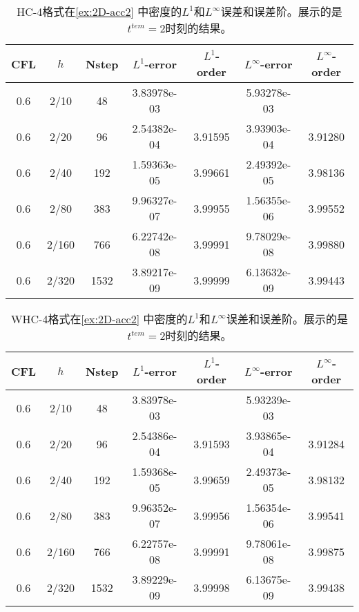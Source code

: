 \def\titleintable{CFL&$h$&Nstep&$L^1$-error&$L^1$-order&$L^\infty$-error&$L^\infty$-order\\}
\begin{table}[htbp]
  \caption{HC-4格式在\cref{ex:2D-acc2} 中密度的$L^1$和$L^\infty$误差和误差阶。展示的是$t^{tem} = 2$时刻的结果。}
  \label{ta:2D-ex2-HC4}
  \centering
  \begin{tabular}{ccccccc}
    \toprule
    \titleintable
    \midrule
    0.6 & 2/10  & 48   & 3.83978e-03 &         & 5.93278e-03 &         \\
    0.6 & 2/20  & 96   & 2.54382e-04 & 3.91595 & 3.93903e-04 & 3.91280 \\
    0.6 & 2/40  & 192  & 1.59363e-05 & 3.99661 & 2.49392e-05 & 3.98136 \\
    0.6 & 2/80  & 383  & 9.96327e-07 & 3.99955 & 1.56355e-06 & 3.99552 \\
    0.6 & 2/160 & 766  & 6.22742e-08 & 3.99991 & 9.78029e-08 & 3.99880 \\
    0.6 & 2/320 & 1532 & 3.89217e-09 & 3.99999 & 6.13632e-09 & 3.99443 \\
    \bottomrule
  \end{tabular}
\end{table}

\begin{table}[htbp]
  \caption{WHC-4格式在\cref{ex:2D-acc2} 中密度的$L^1$和$L^\infty$误差和误差阶。展示的是$t^{tem} = 2$时刻的结果。}
  \label{ta:2D-ex2-WHC4}
  \centering
  \begin{tabular}{ccccccc}
    \toprule
    \titleintable
    \midrule
    0.6 & 2/10  & 48   & 3.83978e-03 &         & 5.93239e-03 &         \\
    0.6 & 2/20  & 96   & 2.54386e-04 & 3.91593 & 3.93865e-04 & 3.91284 \\
    0.6 & 2/40  & 192  & 1.59368e-05 & 3.99659 & 2.49373e-05 & 3.98132 \\
    0.6 & 2/80  & 383  & 9.96352e-07 & 3.99956 & 1.56354e-06 & 3.99541 \\
    0.6 & 2/160 & 766  & 6.22757e-08 & 3.99991 & 9.78061e-08 & 3.99875 \\
    0.6 & 2/320 & 1532 & 3.89229e-09 & 3.99998 & 6.13675e-09 & 3.99438 \\
    \bottomrule
  \end{tabular}
\end{table}

